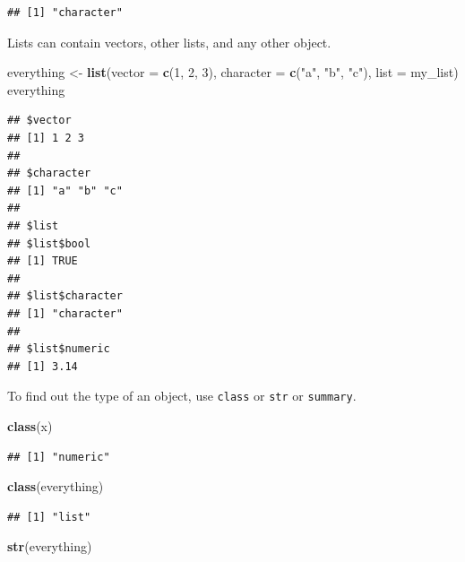 \documentclass[
  openany]{book}
\newenvironment{Shaded}{\begin{snugshade}}{\end{snugshade}}
\newcommand{\DataTypeTok}[1]{\textcolor[rgb]{0.13,0.29,0.53}{#1}}
\newcommand{\DecValTok}[1]{\textcolor[rgb]{0.00,0.00,0.81}{#1}}
\newcommand{\KeywordTok}[1]{\textcolor[rgb]{0.13,0.29,0.53}{\textbf{#1}}}
\newcommand{\NormalTok}[1]{#1}
\newcommand{\StringTok}[1]{\textcolor[rgb]{0.31,0.60,0.02}{#1}}
\begin{document}
\begin{verbatim}
## [1] "character"
\end{verbatim}

Lists can contain vectors, other lists, and any other object.

\begin{Shaded}
\begin{Highlighting}[]
\NormalTok{everything <-}\StringTok{ }\KeywordTok{list}\NormalTok{(}\DataTypeTok{vector =} \KeywordTok{c}\NormalTok{(}\DecValTok{1}\NormalTok{, }\DecValTok{2}\NormalTok{, }\DecValTok{3}\NormalTok{), }
                   \DataTypeTok{character =} \KeywordTok{c}\NormalTok{(}\StringTok{"a"}\NormalTok{, }\StringTok{"b"}\NormalTok{, }\StringTok{"c"}\NormalTok{), }
                   \DataTypeTok{list =}\NormalTok{ my_list)}
\NormalTok{everything}
\end{Highlighting}
\end{Shaded}

\begin{verbatim}
## $vector
## [1] 1 2 3
## 
## $character
## [1] "a" "b" "c"
## 
## $list
## $list$bool
## [1] TRUE
## 
## $list$character
## [1] "character"
## 
## $list$numeric
## [1] 3.14
\end{verbatim}

To find out the type of an object, use \texttt{class} or \texttt{str} or \texttt{summary}.

\begin{Shaded}
\begin{Highlighting}[]
\KeywordTok{class}\NormalTok{(x)}
\end{Highlighting}
\end{Shaded}

\begin{verbatim}
## [1] "numeric"
\end{verbatim}

\begin{Shaded}
\begin{Highlighting}[]
\KeywordTok{class}\NormalTok{(everything)}
\end{Highlighting}
\end{Shaded}

\begin{verbatim}
## [1] "list"
\end{verbatim}

\begin{Shaded}
\begin{Highlighting}[]
\KeywordTok{str}\NormalTok{(everything)}
\end{Highlighting}
\end{Shaded}
\end{document}
